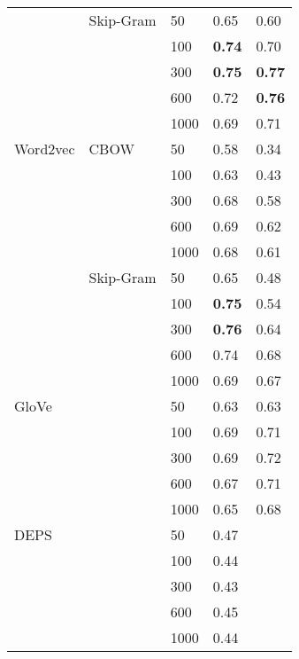 \begin{table}[]
\begin{minipage}{.65\textwidth}
\begin{tabular}{@{}lllll@{}}
                    & Skip-Gram     & 50   & 0.65             & 0.60            \\
                    &               & 100  & \textbf{0.74}    & 0.70            \\
                    &               & 300  & \textbf{0.75}    & \textbf{0.77}   \\
                    &               & 600  & 0.72             & \textbf{0.76}   \\
                    &               & 1000 & 0.69             & 0.71            \\ \cmidrule(r){1-5}
Word2vec            & CBOW          & 50   & 0.58             & 0.34            \\
                    &               & 100  & 0.63             & 0.43            \\
                    &               & 300  & 0.68             & 0.58            \\
                    &               & 600  & 0.69             & 0.62            \\
                    &               & 1000 & 0.68             & 0.61            \\ \cmidrule(lr){2-5}
                    & Skip-Gram     & 50   & 0.65             & 0.48            \\
                    &               & 100  & \textbf{0.75}    & 0.54            \\
                    &               & 300  & \textbf{0.76}    & 0.64            \\
                    &               & 600  & 0.74             & 0.68            \\
                    &               & 1000 & 0.69             & 0.67            \\ \cmidrule(r){1-5}
GloVe               &               & 50   & 0.63             & 0.63            \\
                    &               & 100  & 0.69             & 0.71            \\
                    &               & 300  & 0.69             & 0.72            \\
                    &               & 600  & 0.67             & 0.71            \\
                    &               & 1000 & 0.65             & 0.68            \\ \cmidrule(r){1-5}
DEPS                &               & 50   & 0.47             \\
                    &               & 100  & 0.44             \\
                    &               & 300  & 0.43             \\
                    &               & 600  & 0.45             \\
                    &               & 1000 & 0.44             \\ \cmidrule(r){1-5}
\end{tabular}
\end{minipage}
\end{table}

